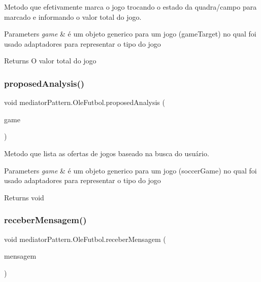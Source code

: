 Metodo que efetivamente marca o jogo trocando o estado da quadra/campo para marcado e informando o valor total do jogo. 


\begin{DoxyParams}{Parameters}
{\em game} & é um objeto generico para um jogo (game\+Target) no qual foi usado adaptadores para representar o tipo do jogo \\
\hline
\end{DoxyParams}
\begin{DoxyReturn}{Returns}
O valor total do jogo 
\end{DoxyReturn}
\mbox{\label{classmediator_pattern_1_1_ole_futbol_a190be5361527915636cca3c3f75ae696}} 
\subsubsection{\texorpdfstring{proposedAnalysis()}{proposedAnalysis()}}
{\footnotesize\ttfamily void mediator\+Pattern.\+Ole\+Futbol.\+proposed\+Analysis (\begin{DoxyParamCaption}\item[{\mbox{\hyperlink{classtemplate_pattern_1_1soccer_game}{soccer\+Game}}}]{game }\end{DoxyParamCaption})}



Metodo que lista as ofertas de jogos baseado na busca do usuário. 


\begin{DoxyParams}{Parameters}
{\em game} & é um objeto generico para um jogo (soccer\+Game) no qual foi usado adaptadores para representar o tipo do jogo \\
\hline
\end{DoxyParams}
\begin{DoxyReturn}{Returns}
void 
\end{DoxyReturn}
\mbox{\label{classmediator_pattern_1_1_ole_futbol_a805bfcc19251a67ab40cd3aa9a92755d}} 
\subsubsection{\texorpdfstring{receberMensagem()}{receberMensagem()}}
{\footnotesize\ttfamily void mediator\+Pattern.\+Ole\+Futbol.\+receber\+Mensagem (\begin{DoxyParamCaption}\item[{String}]{mensagem }\end{DoxyParamCaption})}



